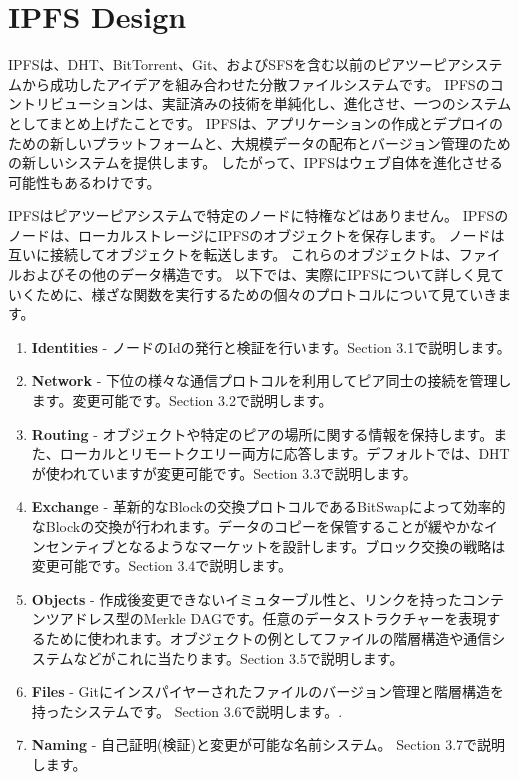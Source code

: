 \documentclass{sig-alternate}
\begin{document}


\section{IPFS Design}
IPFSは、DHT、BitTorrent、Git、およびSFSを含む以前のピアツーピアシステムから成功したアイデアを組み合わせた分散ファイルシステムです。 IPFSのコントリビューションは、実証済みの技術を単純化し、進化させ、一つのシステムとしてまとめ上げたことです。 IPFSは、アプリケーションの作成とデプロイのための新しいプラットフォームと、大規模データの配布とバージョン管理のための新しいシステムを提供します。 したがって、IPFSはウェブ自体を進化させる可能性もあるわけです。

IPFSはピアツーピアシステムで特定のノードに特権などはありません。 IPFSのノードは、ローカルストレージにIPFSのオブジェクトを保存します。 ノードは互いに接続してオブジェクトを転送します。 これらのオブジェクトは、ファイルおよびその他のデータ構造です。 以下では、実際にIPFSについて詳しく見ていくために、様ざな関数を実行するための個々のプロトコルについて見ていきます。


\begin{enumerate}
  \item \textbf{Identities} - ノードのIdの発行と検証を行います。Section 3.1で説明します。

  \item \textbf{Network} - 下位の様々な通信プロトコルを利用してピア同士の接続を管理します。変更可能です。Section 3.2で説明します。

  \item \textbf{Routing} - オブジェクトや特定のピアの場所に関する情報を保持します。また、ローカルとリモートクエリー両方に応答します。デフォルトでは、DHTが使われていますが変更可能です。Section 3.3で説明します。

  \item \textbf{Exchange} - 革新的なBlockの交換プロトコルであるBitSwapによって効率的なBlockの交換が行われます。データのコピーを保管することが緩やかなインセンティブとなるようなマーケットを設計します。ブロック交換の戦略は変更可能です。Section 3.4で説明します。
  
  \item \textbf{Objects} -   作成後変更できないイミュターブル性と、リンクを持ったコンテンツアドレス型のMerkle DAGです。任意のデータストラクチャーを表現するために使われます。オブジェクトの例としてファイルの階層構造や通信システムなどがこれに当たります。Section 3.5で説明します。
  
  \item \textbf{Files} - Gitにインスパイヤーされたファイルのバージョン管理と階層構造を持ったシステムです。 Section 3.6で説明します。.

  \item \textbf{Naming} - 自己証明(検証)と変更が可能な名前システム。 Section 3.7で説明します。
\end{enumerate}
\end{document}
